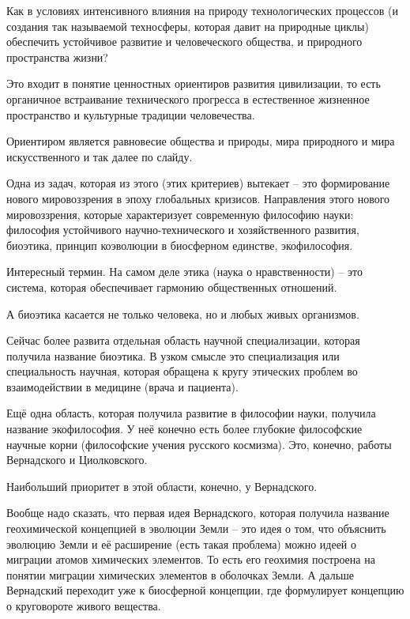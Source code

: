 \documentclass[main.tex]{subfiles}
\begin{document}
Как в условиях интенсивного влияния на природу технологических процессов (и создания так называемой техносферы, которая давит на природные циклы) обеспечить устойчивое развитие и человеческого общества, и природного пространства жизни?

Это входит в понятие ценностных ориентиров развития цивилизации, то есть органичное встраивание технического прогресса в естественное жизненное пространство и культурные традиции человечества.

Ориентиром является равновесие общества и природы, мира природного и мира искусственного и так далее по слайду.

Одна из задач, которая из этого (этих критериев) вытекает -- это формирование нового мировоззрения в эпоху глобальных кризисов.
Направления этого нового мировоззрения, которые характеризует современную философию науки: философия устойчивого научно-технического и хозяйственного развития, биоэтика, принцип коэволюции в биосферном единстве, экофилософия.



Интересный термин.
На самом деле этика (наука о нравственности) -- это система, которая обеспечивает гармонию общественных отношений.

А биоэтика касается не только человека, но и любых живых организмов.

Сейчас более развита отдельная область научной специализации, которая получила название биоэтика.
В узком смысле это специализация или специальность научная, которая обращена к кругу этических проблем во взаимодействии в медицине (врача и пациента).



Ещё одна область, которая получила развитие в философии науки, получила название экофилософия.
У неё конечно есть более глубокие философские научные корни (философские учения русского космизма).
Это, конечно, работы Вернадского и Циолковского.

Наибольший приоритет в этой области, конечно, у Вернадского.

Вообще надо сказать, что первая идея Вернадского, которая получила название геохимической концепцией в эволюции Земли -- это идея о том, что объяснить эволюцию Земли и её расширение (есть такая проблема) можно идеей о миграции атомов химических элементов.
То есть его геохимия построена на понятии миграции химических элементов в оболочках Земли.
А дальше Вернадский переходит уже к биосферной концепции, где формулирует концепцию о круговороте живого вещества.
\end{document}
